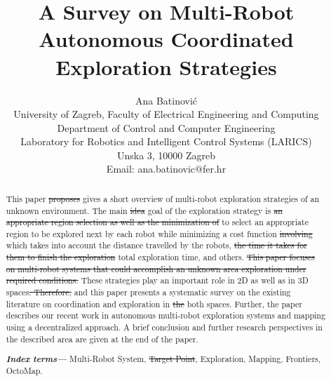 \documentclass[letterpaper, 10 pt, conference]{ieeeconf}  %
\title{\LARGE \bf
	A Survey on Multi-Robot Autonomous Coordinated Exploration Strategies
}
\author{Ana Batinovi\'{c} \\
	University of Zagreb, Faculty of Electrical Engineering and Computing \\
	Department of Control and Computer Engineering\\
	Laboratory for Robotics and Intelligent Control Systems (LARICS) \\
	Unska 3, 10000 Zagreb \\
	Email: ana.batinovic@fer.hr
}
\providecommand{\indexterms}[1]{\textbf{\textit{Index terms---}} #1}
\begin{document}
\maketitle

\thispagestyle{empty}
\pagestyle{empty}


\begin{abstract}

This paper \st{proposes} {\color{red} gives} a short overview of multi-robot exploration strategies of an unknown environment. The main \st{idea} {\color{red}goal} of the exploration strategy is \st{an appropriate region selection as well as the minimization of} {\color{red} to select an appropriate region to be explored next by each robot while minimizing} a cost function \st{involving} {\color{red} which takes into account} the distance travelled by the robots, \st{the time it takes for them to finish the exploration} {\color{red}total exploration time}, and others. \st{This paper focuses on multi-robot systems that could accomplish an unknown area exploration under required conditions.}
These strategies play an important role in 2D as well as in 3D spaces\st{. Therefore,} {\color{red}and} this paper presents a systematic survey on the existing literature on coordination and exploration in \st{the} both spaces.{ \color{red}Further}, the paper describes our recent work in autonomous multi-robot exploration systems and mapping using {\color{red}a} decentralized approach.
A brief conclusion and further research perspectives {\color{red} in the described area} are given at the end of the paper. 

 
\indexterms{Multi-Robot System, \st{Target Point}, Exploration, Mapping, Frontiers, OctoMap.}

\end{abstract}






%









\end{document}

